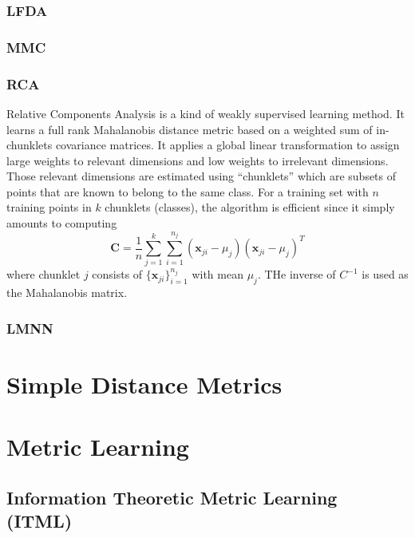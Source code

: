 \documentclass[conference]{IEEEtran}
\begin{document}
\subsubsection{LFDA}
\par
\subsubsection{MMC}
\par
\subsubsection{RCA}
\par
Relative Components Analysis \cite{shental2002adjustment} is a kind of weakly supervised learning method. It learns a full rank Mahalanobis distance metric based on a weighted sum of in-chunklets covariance matrices. It applies a global linear transformation to assign large weights to relevant dimensions and low weights to irrelevant dimensions. 
Those relevant dimensions are estimated using “chunklets” which are subsets of points that are known to belong to the same class.
For a training set with $n$ training points in $k$ chunklets (classes), the algorithm is efficient since it simply amounts to computing
\begin{equation}
	\mathbf{C}=\dfrac{1}{n}\sum_{j=1}^k\sum_{i=1}^{n_j}(\mathbf{x}_{ji}-\mu_j)(\mathbf{x}_{ji}-\mu_j)^T
\end{equation}
where chunklet $j$ consists of $\{\mathbf{x}_{ji}\}^{n_j}_{i=1}$ with mean $\mu_j$. THe inverse of $C^{-1}$ is used as the Mahalanobis matrix.
\subsubsection{LMNN}
\par
\section{Simple Distance Metrics}
\section{Metric Learning}
\subsection{Information Theoretic Metric Learning (ITML)}
\end{document}
